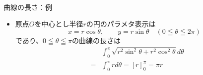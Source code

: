 \begin{slide}{曲線の長さ：例}
\begin{itemize}
\item 原点$O$を中心とし半径$r$の円のパラメタ表示は
\begin{equation}
x = r\cos{\theta}, \qquad y=r\sin{\theta} \quad (0\leqq \theta \leqq 2\pi) \nonumber
\end{equation}
であり、$0 \leqq \theta \leqq \pi$の曲線の長さは
\begin{eqnarray}
&& \int_0^{\pi} \sqrt{r^2\sin^2{\theta} + r^2\cos^2{\theta}} d\theta \nonumber \\
&=& \int_0^{\pi} r d\theta = \left[r\right]_0^{\pi} = \pi r \nonumber 
\end{eqnarray}
\end{itemize}
\end{slide}

